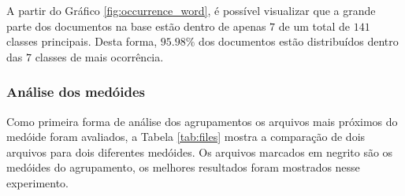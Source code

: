 \documentclass[conference]{IEEEtran}
\begin{document}
A partir do Gráfico \ref{fig:occurrence_word}, é possível visualizar que a grande parte dos documentos na base estão dentro de apenas $7$ de um total de $141$ classes principais. Desta forma, $95.98\%$ dos documentos estão distribuídos dentro das $7$ classes de mais ocorrência.

\subsubsection{Análise dos medóides}

Como primeira forma de análise dos agrupamentos os arquivos mais próximos do medóide foram avaliados, a Tabela \ref{tab:files} mostra a comparação de dois arquivos para dois diferentes medóides. Os arquivos marcados em negrito são os medóides do agrupamento, os melhores resultados foram mostrados nesse experimento.
\end{document}
